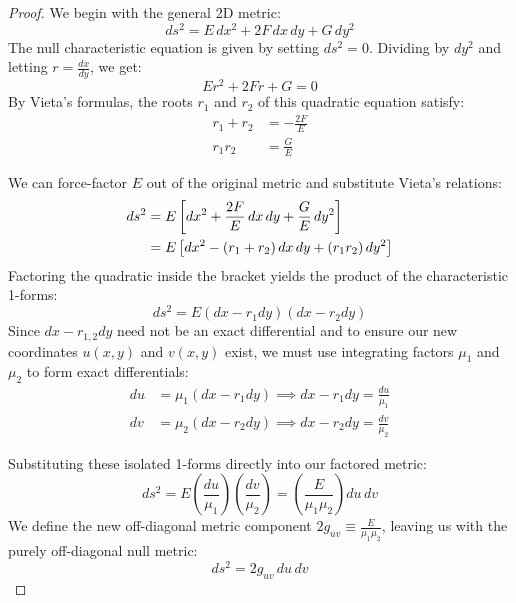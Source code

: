 \begin{tcolorbox}[breakable]
	\begin{proof}
		We begin with the general 2D metric:
		\begin{equation}
			ds^2 = E\, dx^2 + 2F\, dx\, dy + G\, dy^2
		\end{equation}
		The null characteristic equation is given by setting $ds^2 = 0$. Dividing by $dy^2$ and letting $r = \frac{dx}{dy}$, we get:
		\begin{equation}
			E r^2 + 2F r + G = 0
		\end{equation}
		By Vieta's formulas, the roots $r_1$ and $r_2$ of this quadratic equation satisfy:
		\begin{align}
			r_1 + r_2 &= -\frac{2F}{E} \\
			r_1 r_2 &= \frac{G}{E}
		\end{align}
		
		We can force-factor $E$ out of the original metric and substitute Vieta's relations:
		\begin{align}
			ds^2 &= E \left[ dx^2 + \frac{2F}{E}\, dx\, dy + \frac{G}{E}\, dy^2 \right] \notag\\
			&= E \left[ dx^2 - (r_1 + r_2)\, dx\, dy + (r_1 r_2)\, dy^2 \right]
		\end{align}
		Factoring the quadratic inside the bracket yields the product of the characteristic 1-forms:
		\begin{equation}
			ds^2 = E (dx - r_1 dy)(dx - r_2 dy)
		\end{equation}
		Since $dx-r_{1,2}dy$ need not be an exact differential and to ensure our new coordinates $u(x,y)$ and $v(x,y)$ exist, we must use integrating factors $\mu_1$ and $\mu_2$ to form exact differentials:
		\begin{align}
			du &= \mu_1 (dx - r_1 dy) \implies dx - r_1 dy = \frac{du}{\mu_1} \\
			dv &= \mu_2 (dx - r_2 dy) \implies dx - r_2 dy = \frac{dv}{\mu_2}
		\end{align}
		
		Substituting these isolated 1-forms directly into our factored metric:
		\begin{equation}
			ds^2 = E \left( \frac{du}{\mu_1} \right) \left( \frac{dv}{\mu_2} \right) = \left( \frac{E}{\mu_1 \mu_2} \right) du\, dv
		\end{equation}
		We define the new off-diagonal metric component $2g_{uv} \equiv \frac{E}{\mu_1 \mu_2}$, leaving us with the purely off-diagonal null metric:
		\begin{equation}
			ds^2 = 2g_{uv}\, du\, dv
		\end{equation}
		

\end{proof}
\end{tcolorbox}
